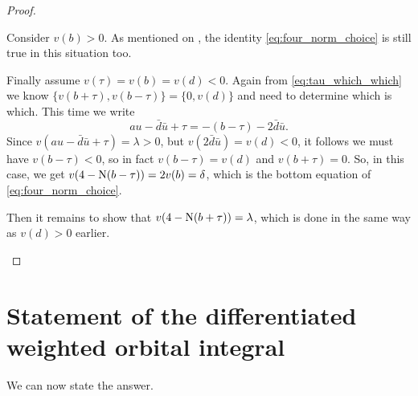 \begin{proof}
\begin{itemize}
  \ii Consider $v(b) > 0$.
  As mentioned on \cite[p.\ 242]{ref:AFL}, the identity \eqref{eq:four_norm_choice}
  is still true in this situation too.

  \ii Finally assume $v(\tau) = v(b) = v(d) < 0$.
  Again from \eqref{eq:tau_which_which}
  we know $\{v(b+\tau), v(b-\tau)\} = \{0, v(d)\}$ and need to determine which is which.
  This time we write
  \[ au - \bar d \bar u + \tau = -(b - \tau) - 2 \bar d \bar u. \]
  Since $v(au - \bar d \bar u + \tau) = \lambda > 0$,
  but $v(2 \bar d \bar u) = v(d) < 0$,
  it follows we must have $v(b-\tau) < 0$,
  so in fact $v(b-\tau) = v(d)$ and $v(b+\tau) = 0$.
  So, in this case, we get $v(4 - \operatorname{N}(b-\tau)) = 2v(b) = \delta$,
  which is the bottom equation of \eqref{eq:four_norm_choice}.

  Then it remains to show that $v(4-\operatorname{N}(b+\tau)) = \lambda$,
  which is done in the same way as $v(d) > 0$ earlier.
  \qedhere
  \end{itemize}
\end{proof}

\section{Statement of the differentiated weighted orbital integral}
We can now state the answer.
